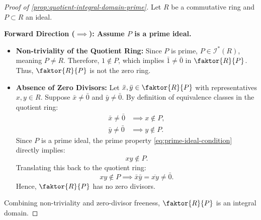 \begin{content}
\begin{proof}[Proof of \cref{prop:quotient-integral-domain-prime}]
Let $R$ be a commutative ring and $P \subset R$ an ideal.

\textbf{Forward Direction ($\implies$): Assume $P$ is a prime ideal.}
\begin{itemize}
    \item \textbf{Non-triviality of the Quotient Ring:} Since $P$ is prime, $P \in \mathscr{I}^*(R)$, meaning $P \neq R$. Therefore, $1 \notin P$, which implies $\bar{1} \neq \bar{0}$ in $\faktor{R}{P}$. Thus, $\faktor{R}{P}$ is not the zero ring.
    \item \textbf{Absence of Zero Divisors:} Let $\bar{x}, \bar{y} \in \faktor{R}{P}$ with representatives $x, y \in R$. Suppose $\bar{x} \neq \bar{0}$ and $\bar{y} \neq \bar{0}$.
    By definition of equivalence classes in the quotient ring:
    \begin{align*}
    \bar{x} \neq \bar{0} &\implies x \notin P, \\
    \bar{y} \neq \bar{0} &\implies y \notin P.
    \end{align*}
    Since $P$ is a prime ideal, the prime property \eqref{eq:prime-ideal-condition} directly implies:
    \[
    x y \notin P.
    \]
    Translating this back to the quotient ring:
    \[
    x y \notin P \implies \bar{x} \bar{y} = \overline{x y} \neq \bar{0}.
    \]
    Hence, $\faktor{R}{P}$ has no zero divisors.
\end{itemize}
Combining non-triviality and zero-divisor freeness, $\faktor{R}{P}$ is an integral domain.
\end{proof}

\end{content}


